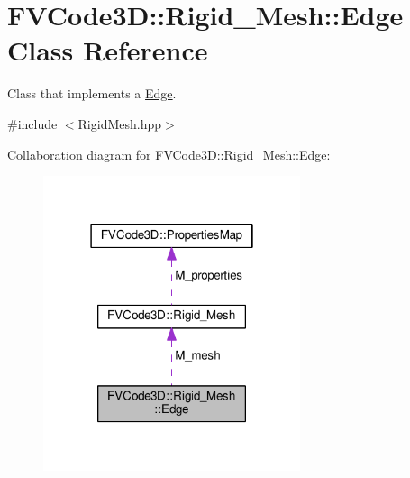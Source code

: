 \hypertarget{classFVCode3D_1_1Rigid__Mesh_1_1Edge}{}\section{F\+V\+Code3D\+:\+:Rigid\+\_\+\+Mesh\+:\+:Edge Class Reference}
\label{classFVCode3D_1_1Rigid__Mesh_1_1Edge}


Class that implements a \hyperlink{classFVCode3D_1_1Rigid__Mesh_1_1Edge}{Edge}.  




{\ttfamily \#include $<$Rigid\+Mesh.\+hpp$>$}



Collaboration diagram for F\+V\+Code3D\+:\+:Rigid\+\_\+\+Mesh\+:\+:Edge\+:
\nopagebreak
\begin{figure}[H]
\begin{center}
\leavevmode
\includegraphics[width=214pt]{classFVCode3D_1_1Rigid__Mesh_1_1Edge__coll__graph}
\end{center}
\end{figure}
